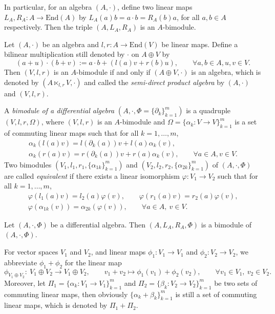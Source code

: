 \documentclass[pdftex]{sigma}
\numberwithin{equation}{section}
\newcommand{\End}{\mathrm{End}}
\begin{document}
In particular, for an algebra $(A,\cdot)$, define two linear maps $L_{A}, R_{A}\colon A \to \End(A)$ by $L_A(a)b = a \cdot b = R_A(b)a$, for all $a,b\in A$ respectively.
Then the triple $(A, L_{A}, R_{A})$ is an $A$-bimodule.

Let $(A, \cdot)$ be an algebra and $l, r\colon A \to \End (V)$ be
linear maps. Define a bilinear multiplication still denoted by
$\cdot$ on $A \oplus V$ by
\begin{equation}
 (a + u) \cdot (b + v) := a \cdot b + ( l(a) v + r(b)u ), \qquad
 \forall a, b \in A, u, v \in V. \label{eq:semiprod}
\end{equation}
Then $(V, l, r)$ is an $A$-bimodule if and only
if $(A \oplus V,\cdot)$ is an algebra, which is denoted by $(A
\ltimes_{l,r} V, \cdot)$ and called the \textit{semi-direct
product algebra} by $(A, \cdot)$ and $(V, l, r)$.

\begin{Definition}\label{def:repd}
 A \textit{bimodule of a differential algebra} $(A, \cdot, \Phi\!=\!\{\partial_k\}_{k=1}^m)$ is a quadruple $(V, l, r, \Omega)$, where $(V, l, r)$ is an $A$-bimodule and $\Omega = \{\alpha_k\colon V \to V\}_{k=1}^m$ is a set of commuting linear maps
 such that for all $k=1, \dots, m$,
 \begin{gather}
 \alpha_k( l(a)v ) = l( \partial_k(a) ) v + l(a) \alpha_k(v), \label{eq:repd1} \\
 \alpha_k( r(a)v ) = r( \partial_k(a) ) v + r(a) \alpha_k(v), \qquad
 \forall a \in A, v \in V. \label{eq:repd2}
 \end{gather}
 Two bimodules $(V_1, l_1, r_1, \{\alpha_{1k}\}_{k=1}^m)$ and $(V_2, l_2, r_2, \{\alpha_{2k}\}_{k=1}^m)$ of $(A, \cdot, \Phi)$ are called \textit{equivalent}
 if there exists a linear isomorphism $\varphi\colon V_1 \to V_2$
 such that for all $k=1, \dots, m$,
 \begin{gather*}
 \varphi( l_1(a)v ) = l_2(a) \varphi(v), \qquad
 \varphi( r_1(a)v ) = r_2(a) \varphi(v), \\
 \varphi( \alpha_{1k}(v) ) = \alpha_{2k}( \varphi(v) ), \qquad
 \forall a \in A, \ v \in V.
 \end{gather*}
\end{Definition}

\begin{Example}
 Let $(A, \cdot, \Phi)$ be a differential algebra.
 Then $(A, L_A, R_A, \Phi)$ is a bimodule of $(A, \cdot, \Phi)$.
\end{Example}

For vector spaces $V_1$ and $V_2$,
and linear maps $\phi_1\colon V_1 \to V_1$ and $\phi_2: V_2 \to V_2$,
we abbreviate $\phi_1 + \phi_2$ for the linear map
\begin{equation*}
 \phi_{V_1 \oplus V_2}\colon \ V_1 \oplus V_2 \to V_1 \oplus V_2, \qquad
 v_1 + v_2 \mapsto \phi_1(v_1) + \phi_2(v_2), \qquad
 \forall v_1 \in V_1, \ v_2 \in V_2.
\end{equation*}
Moreover, let $\Pi_1 = \{\alpha_k\colon V_1 \to V_1\}_{k=1}^m$ and $\Pi_2 = \{\beta_k\colon V_2 \to V_2\}_{k=1}^m$ be two sets of commuting linear maps,
then obviously $\{\alpha_k + \beta_k\}_{k=1}^m$ is still a set of commuting linear maps, which is denoted by $\Pi_1 + \Pi_2$.
\end{document}
